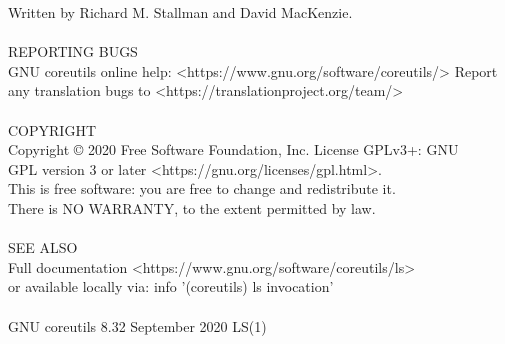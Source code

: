 \documentclass{article}
\begin{document}
       Written by Richard M. Stallman and David MacKenzie. \\
\\
REPORTING BUGS \\
       GNU coreutils online help: <https://www.gnu.org/software/coreutils/>
       Report any translation bugs to <https://translationproject.org/team/> \\
\\
COPYRIGHT \\
       Copyright © 2020 Free Software Foundation, Inc.   License  GPLv3+:  GNU \\
       GPL version 3 or later <https://gnu.org/licenses/gpl.html>. \\
       This  is  free  software:  you  are free to change and redistribute it. \\
       There is NO WARRANTY, to the extent permitted by law. \\
\\
SEE ALSO \\
       Full documentation <https://www.gnu.org/software/coreutils/ls> \\
       or available locally via: info '(coreutils) ls invocation' \\
\\
GNU coreutils 8.32              September 2020                           LS(1) \\
\end{document}
